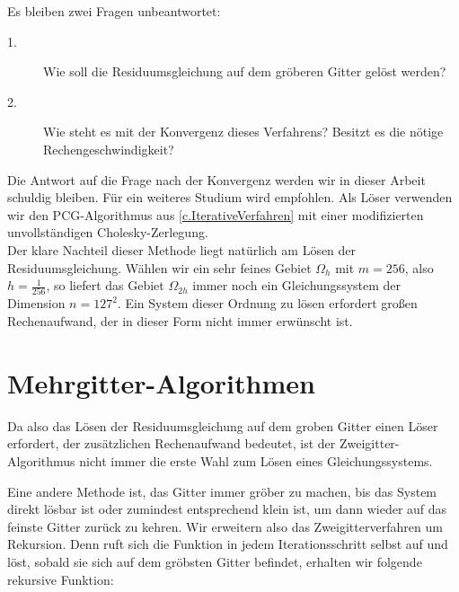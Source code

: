 Es bleiben zwei Fragen unbeantwortet:
\begin{description}
\item[1.] Wie soll die Residuumsgleichung auf dem gröberen Gitter gelöst werden?
\item[2.] Wie steht es mit der Konvergenz dieses Verfahrens? Besitzt es die nötige Rechengeschwindigkeit?
\end{description}

Die Antwort auf die Frage nach der Konvergenz werden wir in dieser Arbeit schuldig bleiben. Für ein weiteres Studium wird \cite{SAAD8} empfohlen.
Als Löser verwenden wir den PCG-Algorithmus aus \autoref{c.IterativeVerfahren} mit einer modifizierten unvollständigen Cholesky-Zerlegung.\\

Der klare Nachteil dieser Methode liegt natürlich am Lösen der Residuumsgleichung. Wählen wir ein sehr feines Gebiet $\Omega_{h}$ mit $m = 256$, also $h = \frac {1} {256}$, so liefert das Gebiet $\Omega_{2h}$ immer noch ein Gleichungssystem der Dimension $n = 127^{2}$. Ein System dieser Ordnung zu lösen erfordert großen Rechenaufwand, der in dieser Form nicht immer erwünscht ist. \\

\section{Mehrgitter-Algorithmen}\label{s.Mehrgitteralgorithmus}

Da also das Lösen der Residuumsgleichung auf dem groben Gitter einen Löser erfordert, der zusätzlichen Rechenaufwand bedeutet, ist der Zweigitter-Algorithmus nicht immer die erste Wahl zum Lösen eines Gleichungssystems.

Eine andere Methode ist, das Gitter immer gröber zu machen, bis das System direkt lösbar ist oder zumindest entsprechend klein ist, um dann wieder auf das feinste Gitter zurück zu kehren. Wir erweitern also das Zweigitterverfahren um Rekursion. Denn ruft sich die Funktion in jedem Iterationsschritt selbst auf und löst, sobald sie sich auf dem gröbsten Gitter befindet, erhalten wir folgende rekursive Funktion:

